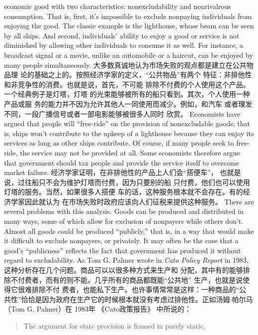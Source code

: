 \begin{paracol}{2}
economic good with two characteristics: nonexcludability and
nonrivalrous consumption. That is, first, it's impossible to exclude nonpaying individuals from enjoying the good. The classic example is the lighthouse, whose beam can be seen by all
ships. And second, individuals' ability to enjoy a good or service
is not diminished by allowing other individuals to consume it as
well. For instance, a broadcast signal or a movie, unlike an automobile or a haircut, can be enjoyed by many people simultaneously.
\switchcolumn
大多数真诚地认为市场失败的观点都是建立在公共物品理
论的基础之上的。按照经济学家的定义，“公共物品”有两个
特征：非排他性和非竞争性的消费。也就是说，首先，不可能
排除不付费的个人使用这个产品。一个经典例子是灯塔，灯塔
的光束能够被所有的船只看到。其次，个人使用一种产品或服
务的能力并不因为允许其他人一同使用而减少。例如，和汽车
或者理发不同，一段广播信号或者一部电影能够被很多人同时
欣赏。
\switchcolumn*
Economists have argued that people will ``free-ride'' on the
provision of nonexcludable goods; that is, ships won't contribute to the upkeep of a lighthouse because they can enjoy its
services as long as other ships contribute. Of course, if many
people seek to free-ride, the service may not be provided at all.
Some economists therefore argue that government should tax
people and provide the service itself to overcome market failure.
\switchcolumn
经济学家证明，在非排他性的产品上人们会“搭便车”，
也就是说，过往船只不会为维护灯塔而付费，因为只要别的船
只付费，他们也可以使用灯塔的服务。当然，如果很多人搭便
车的话，这种服务根本就不会存在。有的经济学家因此就认为
在市场失败时政府应该向人们征税来提供这种服务。
\switchcolumn*
There are several problems with this analysis. Goods can be produced and distributed in many ways, some of which allow
for exclusion of nonpayers while others don't. Almost all goods
could be produced ``publicly,'' that is, in a way that would make
it difficult to exclude nonpayers, or privately. It may often be
the case that a good's ``publicness'' reflects the fact that government has produced it without regard to excludability. As Tom
G. Palmer wrote in \textit{Cato Policy Report} in 1983,
\switchcolumn
这种分析存在几个问题。商品可以以很多种方式来生产和
分配，其中有的能够排除不付费者，而有的则不能。几乎所有的商品都既能“公共地” 生产，也就是说使得它很难排除不付
费者，也能私下生产。也许事情常常是这样：一种商品的“公
共性”恰恰是因为政府在生产它的时候根本就没有考虑过排他性。正如汤姆$\cdot$帕尔马（Tom G. Palmer）在 1983年 《Cato政策报告》 中所说的：
\switchcolumn*
\begin{quote}
The argument for state provision is framed in purely static,

\end{quote}
\end{paracol}
